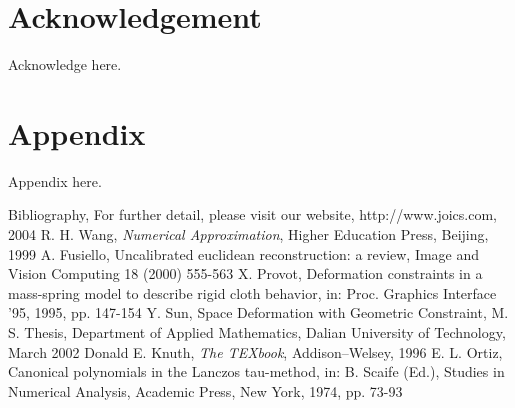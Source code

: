 \documentclass[print]{jicspack}
\begin{document}
\section*{Acknowledgement}
Acknowledge here.
\section*{Appendix} Appendix here.
\begin{thebibliography}{00}\label{ref:ref}




 Bibliography, For further detail, please visit our
website, http://www.joics.com, 2004
 R. H. Wang, {\it Numerical Approximation}, Higher Education Press, Beijing, 1999
 A. Fusiello, Uncalibrated euclidean reconstruction: a review, Image and Vision Computing 18 (2000) 555-563
 X. Provot, Deformation constraints in a mass-spring model to describe rigid cloth behavior, in: Proc. Graphics Interface '95, 1995, pp. 147-154
 Y. Sun, Space Deformation with Geometric Constraint, M. S. Thesis, Department of Applied Mathematics, Dalian University of Technology, March 2002
 Donald E. Knuth, {\it The TEXbook}, Addison--Welsey, 1996
E. L. Ortiz, Canonical polynomials in the Lanczos tau-method, in: B. Scaife (Ed.), Studies in Numerical Analysis, Academic Press, New York, 1974, pp. 73-93
\end{thebibliography}
\end{document}
